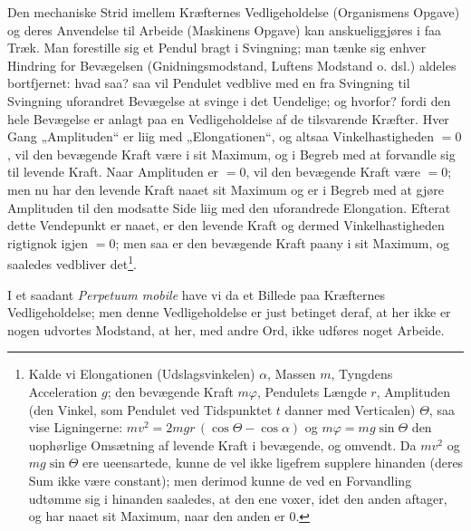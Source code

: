 \documentclass[12pt,a4paper]{book}
\begin{document}
Den mechaniske Strid imellem Kræfternes Vedligeholdelse (Organismens
Opgave) og deres Anvendelse til Arbeide (Maskinens Opgave) kan
anskueliggjøres i faa Træk. Man forestille sig et Pendul bragt i
Svingning; man tænke sig enhver Hindring for Bevægelsen
(Gnidningsmodstand, Luftens Modstand o. dsl.) aldeles bortfjernet: hvad
saa? saa vil Pendulet vedblive med en fra Svingning til Svingning
uforandret Bevægelse at svinge i det Uendelige; og hvorfor? fordi den
hele Bevægelse er anlagt paa en Vedligeholdelse af de tilsvarende
Kræfter. Hver Gang „Amplituden“ er liig med „Elongationen“, og altsaa
Vinkelhastigheden $= 0$, vil den bevægende Kraft være i sit Maximum, og i
Begreb med at forvandle sig til levende Kraft. Naar Amplituden er $= 0$,
vil den bevægende Kraft være $= 0$; men nu har den levende Kraft naaet
sit Maximum og er i Begreb med at gjøre Amplituden til den modsatte Side
liig med den uforandrede Elongation. Efterat dette Vendepunkt er naaet,
er den levende Kraft og dermed Vinkelhastigheden rigtignok igjen $= 0$;
men saa er den bevægende Kraft paany i sit Maximum, og saaledes vedbliver
det\footnote{Kalde vi Elongationen (Udslagsvinkelen) $\alpha$, Massen
$m$, Tyngdens Acceleration $g$; den bevægende Kraft $m\varphi$, Pendulets
Længde $r$, Amplituden (den Vinkel, som Pendulet ved Tidspunktet $t$
danner med Verticalen) $\Theta$, saa vise Ligningerne:
$mv^2 = 2mgr\,(\cos\Theta - \cos\alpha)$ og
$m\varphi = mg\sin\Theta$
den uophørlige Omsætning af levende Kraft i bevægende, og omvendt. Da
$mv^2$ og $mg\sin\Theta$ ere ueensartede, kunne de vel ikke ligefrem
supplere hinanden (deres Sum ikke være constant); men derimod kunne de
ved en Forvandling udtømme sig i hinanden saaledes, at den ene voxer,
idet den anden aftager, og har naaet sit Maximum, naar den anden er 0.}.

\setcounter{footnote}{0}
I et saadant \textit{Perpetuum mobile} have vi da et Billede paa
Kræfternes Vedligeholdelse; men denne Vedligeholdelse er just betinget
deraf, at her ikke er nogen udvortes Modstand, at her, med andre Ord,
ikke udføres noget Arbeide.
\end{document}

